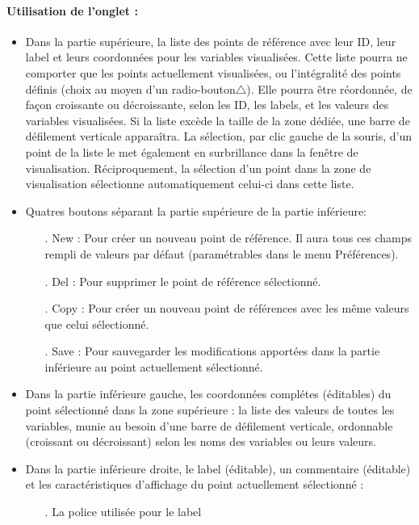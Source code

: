 \documentclass[a4paper]{article}
\begin{document}
\paragraph{Utilisation de l'onglet :}

\begin{itemize}
\item Dans la partie supérieure, la liste des points de référence avec leur ID, leur label et leurs coordonnées pour les variables visualisées. Cette liste pourra ne comporter que les points actuellement visualisées, ou l'intégralité des points définis (choix au moyen d'un radio-bouton$\triangle$). Elle pourra être réordonnée, de façon croissante ou décroissante, selon les ID, les labels, et les valeurs des variables visualisées. Si la liste excède la taille de la zone dédiée, une barre de défilement verticale apparaîtra. La sélection, par clic gauche de la souris, d'un point de la liste le met également en surbrillance dans la fenêtre de visualisation. Réciproquement, la sélection d'un point dans la zone de visualisation sélectionne automatiquement celui-ci dans cette liste.
\item Quatres boutons séparant la partie supérieure de la partie inférieure:
  \begin{itemize}
  \item[.] New : Pour créer un nouveau point de référence. Il aura tous ces champs rempli de valeurs par défaut (paramétrables dans le menu Préférences).
  \item[.] Del : Pour supprimer le point de référence sélectionné.
  \item[.] Copy : Pour créer un nouveau point de références avec les même valeurs que celui sélectionné.
  \item[.] Save : Pour sauvegarder les modifications apportées dans la partie inférieure au point actuellement sélectionné.
  \end{itemize}
\item Dans la partie inférieure gauche, les coordonnées complétes (éditables) du point sélectionné dans la zone supérieure : la liste des valeurs de toutes les variables, munie au besoin d'une barre de défilement verticale, ordonnable (croissant ou décroissant) selon les noms des variables ou leurs valeurs.
\item Dans la partie inférieure droite, le label (éditable), un commentaire (éditable) et les caractéristiques d'affichage du point actuellement sélectionné :
  \begin{itemize}
  \item[.] La police utilisée pour le label

\end{itemize}
\end{itemize}
\end{document}

